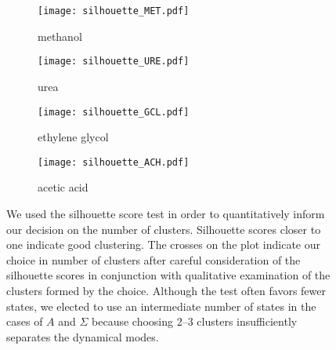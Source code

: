   \begin{figure}[h!]
  \centering
  \begin{subfigure}{0.45\textwidth}
  \texttt{[image: silhouette\_MET.pdf]}
  \caption{methanol}\label{fig:silhouette_MET}
  \end{subfigure}
  \begin{subfigure}{0.45\textwidth}
  \texttt{[image: silhouette\_URE.pdf]}
  \caption{urea}\label{fig:silhouette_URE}
  \end{subfigure}
  \begin{subfigure}{0.45\textwidth}
  \texttt{[image: silhouette\_GCL.pdf]}
  \caption{ethylene glycol}\label{fig:silhouette_GCL}
  \end{subfigure}
  \begin{subfigure}{0.45\textwidth}
  \texttt{[image: silhouette\_ACH.pdf]}
  \caption{acetic acid}\label{fig:silhouette_ACH}
  \end{subfigure}
  \caption{We used the silhouette score test in order to quantitatively
  inform our decision on the number of clusters. Silhouette scores 
  closer to one indicate good clustering. The crosses on the plot indicate
  our choice in number of clusters after careful consideration of the
  silhouette scores in conjunction with qualitative examination of the clusters
  formed by the choice. Although the test often
  favors fewer states, we elected to use an intermediate number of states in 
  the cases of $A$ and $\Sigma$ because choosing 2--3 clusters 
  insufficiently separates the dynamical modes. }\label{fig:silhouette}
  \end{figure}